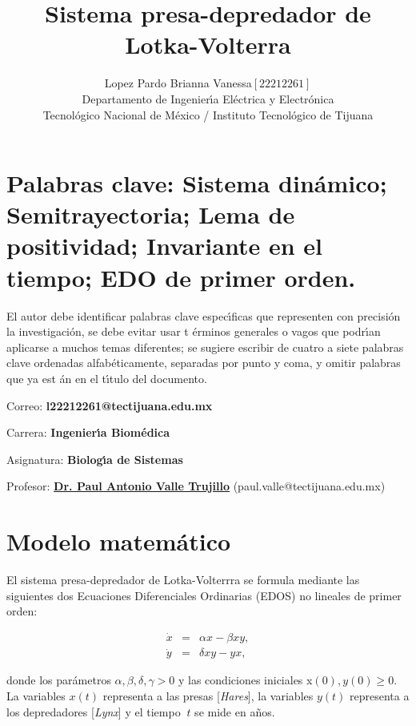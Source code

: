 \documentclass[letterpaper,11pt]{article}
\begin{document}
\title{Sistema presa-depredador de Lotka-Volterra}
\author{Lopez Pardo Brianna Vanessa$\left[ 22212261\right] $ \\
Departamento de Ingenier\'{\i}a El\'{e}ctrica y Electr\'{o}nica\\
Tecnol\'{o}gico Nacional de M\'{e}xico / Instituto Tecnol\'{o}gico de Tijuana%
}
\maketitle

\section{\noindent \textbf{Palabras clave: }Sistema din\'{a}mico;
Semitrayectoria; Lema de positividad; Invariante en el tiempo; EDO de primer
orden.}

\noindent El autor debe identificar palabras clave espec\'{\i}ficas que
representen con precisi\'{o}n la investigaci\'{o}n, se debe evitar usar t%
\'{e}rminos generales o vagos que podr\'{\i}an aplicarse a muchos temas
diferentes; se sugiere escribir de cuatro a siete palabras clave ordenadas
alfab\'{e}ticamente, separadas por punto y coma, y omitir palabras que ya est%
\'{a}n en el t\'{\i}tulo del documento.

\bigskip

\noindent Correo: \textbf{l22212261@tectijuana.edu.mx}

\noindent \noindent Carrera: \textbf{Ingenier\'{\i}a Biom\'{e}dica }

\noindent Asignatura: \textbf{Biolog\'{\i}a de Sistemas}

\noindent Profesor: \href{https://biomath.xyz/}{\textbf{Dr. Paul Antonio
Valle Trujillo}} (paul.valle@tectijuana.edu.mx)

\section{Modelo matem\'{a}tico}

El sistema presa-depredador de Lotka-Volterrra se formula mediante las
siguientes dos Ecuaciones Diferenciales Ordinarias (EDOS) no lineales de
primer orden:

\begin{eqnarray*}
\dot{x} &=&\alpha x-\beta xy, \\
\dot{y} &=&\delta xy-yx,
\end{eqnarray*}

donde los par\'{a}metros $\alpha ,\beta ,\delta ,\gamma >0$ y las
condiciones iniciales x$(0),y(0)\geq 0$. La variables $x(t)$ representa a
las presas [\textit{Hares}], la variables $y(t)$ representa a los
depredadores [\textit{Lynx}] y el tiempo $\ t$ se mide en a\~{n}os.
\end{document}
